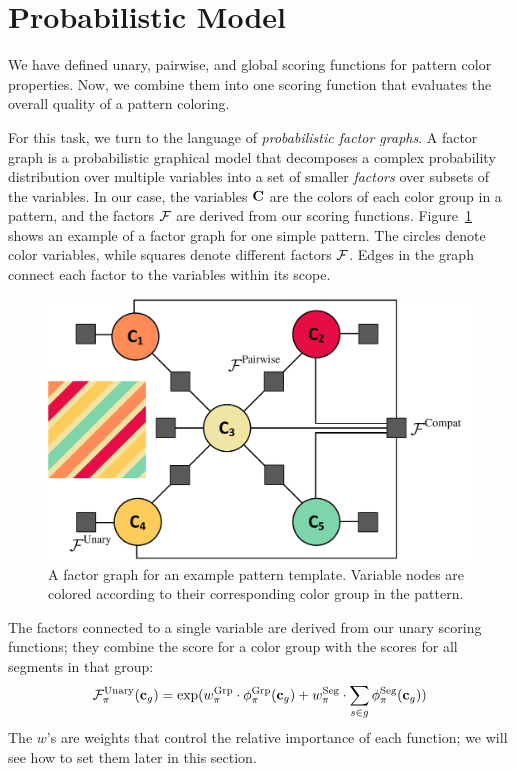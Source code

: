 \section{Probabilistic Model}
\label{sec:model}

We have defined unary, pairwise, and global scoring functions for pattern color properties. Now, we combine them into one scoring function that evaluates the overall quality of a pattern coloring.

For this task, we turn to the language of \emph{probabilistic factor graphs}. A factor graph is a probabilistic graphical model that decomposes a complex probability distribution over multiple variables into a set of smaller \emph{factors} over subsets of the variables. In our case, the variables $\mathbf{C}$ are the colors of each color group in a pattern, and the factors $\mathcal{F}$ are derived from our scoring functions. Figure~\ref{fig:FactorGraph} shows an example of a factor graph for one simple pattern. The circles denote color variables, while squares denote different factors $\mathcal{F}$. Edges in the graph connect each factor to the variables within its scope.

\begin{figure}[ht]
\centering
\includegraphics[width=0.85\columnwidth]{figs/factorGraphNew}
\caption{A factor graph for an example pattern template. Variable nodes are colored according to their corresponding color group in the pattern.}
\label{fig:FactorGraph}
\end{figure}

The factors connected to a single variable are derived from our unary scoring functions; they combine the score for a color group with the scores for all segments in that group:
\begin{equation*}
 \mathcal{F}^{\textrm{Unary}}_\pi(\mathbf{c}_g) =
 		\exp( w^{\textrm{Grp}}_\pi \cdot \phi^{\textrm{Grp}}_\pi(\mathbf{c}_g)  \\
 		     + w^{\textrm{Seg}}_\pi \cdot \sum_{s \in g} \phi^{\textrm{Seg}}_\pi(\mathbf{c}_g)) 
\end{equation*}
The $w$'s are weights that control the relative importance of each function; we will see how to set them later in this section.

